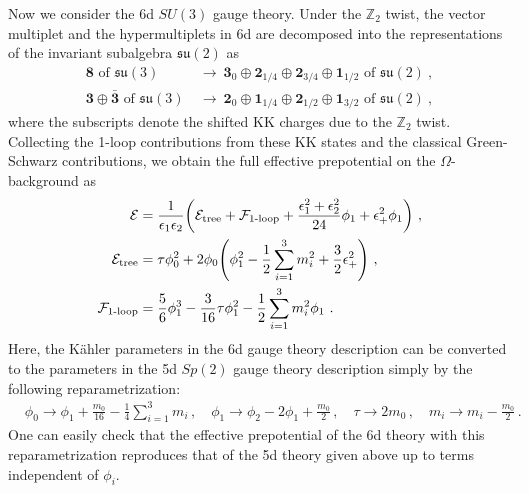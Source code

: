 Now we consider the 6d $SU(3)$ gauge theory. Under the $\mathbb{Z}_2$ twist, the vector multiplet and the hypermultiplets in 6d are decomposed into the representations of the invariant subalgebra $\mathfrak{su}(2)$ as
\begin{align}
\mathbf{8} \text{ of } \mathfrak{su}(3) \ &\to \ \mathbf{3}_0 \oplus \mathbf{2}_{1/4} \oplus \mathbf{2}_{3/4} \oplus \mathbf{1}_{1/2} \text{ of } \mathfrak{su}(2)\ , \nonumber \\
\mathbf{3} \oplus \bar{\mathbf{3}} \text{ of } \mathfrak{su}(3) \ &\to \ \mathbf{2}_0 \oplus \mathbf{1}_{1/4} \oplus \mathbf{2}_{1/2} \oplus \mathbf{1}_{3/2} \text{ of } \mathfrak{su}(2) \ ,
\end{align}
where the subscripts denote the shifted KK charges due to the $\mathbb{Z}_2$ twist. Collecting the 1-loop contributions from these KK states and the classical Green-Schwarz contributions, we obtain the full effective prepotential on the $\Omega$-background as
\begin{align}
\mathcal{E} \label{eq:su3_2_E}
&=\frac{1}{\epsilon_1 \epsilon_2} \bigg( \mathcal{E}_{\mathrm{tree}} + \mathcal{F}_{\text{1-loop}} + \frac{\epsilon_1^2 + \epsilon_2^2}{24}\phi_1 + \epsilon_+^2 \phi_1 \bigg) \ , \nonumber \\
\mathcal{E}_{\mathrm{tree}}
&= \tau \phi_0^2 + 2\phi_0 \qty( \phi_1^2 - \frac{1}{2}\sum_{i=1}^3 m_i^2 + \frac{3}{2} \epsilon_+^2 )\ , \nonumber  \\
%
\mathcal{F}_{\text{1-loop}}
&= \frac{5}{6}\phi_1^3 - \frac{3}{16}\tau \phi_1^2 - \frac{1}{2} \sum_{i=1}^3 m_i^2 \phi_1\ . 
\end{align}
Here, the K\"ahler parameters in the 6d gauge theory description can be converted to the parameters in the 5d $Sp(2)$ gauge theory description simply by the following reparametrization:
\begin{align}
&\phi_0 \to \phi_1 + \frac{m_0}{16} - \frac{1}{4} \sum_{i=1}^3 m_i\,, \quad
\phi_1 \to \phi_2 - 2\phi_1 + \frac{m_0}{2}\,, \quad
\tau \to 2m_0\,,  \quad
m_i \to m_i - \frac{m_0}{2} \,.
\end{align}
One can easily check that the effective prepotential of the 6d theory with this reparametrization reproduces that of the 5d theory given above up to terms independent of $\phi_i$.

